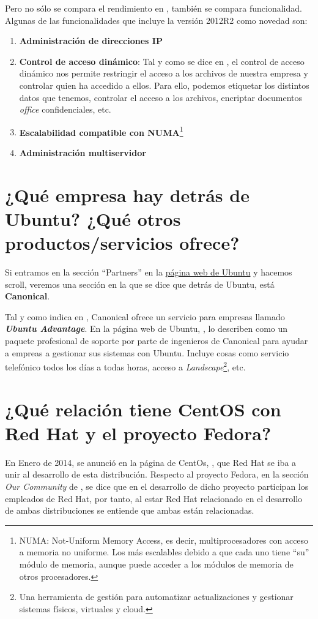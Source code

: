 \documentclass[10pt,a4paper,spanish]{article}
\numberwithin{equation}{section} %
\numberwithin{figure}{section} %
\numberwithin{table}{section} %
\begin{document}
Pero no sólo se compara el rendimiento en \cite{comws2012}, también se compara funcionalidad. Algunas de las funcionalidades que incluye la versión 2012R2 como novedad son:
\begin{enumerate}[$\bullet$]
    \item \textbf{Administración de direcciones IP}
    \item \textbf{Control de acceso dinámico}: Tal y como se dice en \cite{cad}, el control de acceso dinámico nos permite restringir el acceso a los archivos de nuestra empresa y controlar quien ha accedido a ellos. Para ello, podemos etiquetar los distintos datos que tenemos, controlar el acceso a los archivos, encriptar documentos \textit{office} confidenciales, etc.
    \item \textbf{Escalabilidad compatible con NUMA}\footnote{NUMA: Not-Uniform Memory Access, es decir, multiprocesadores con acceso a memoria no uniforme. Los más escalables debido a que cada uno tiene ``su'' módulo de memoria, aunque puede acceder a los módulos de memoria de otros procesadores.}
    \item \textbf{Administración multiservidor}
\end{enumerate}

\section{¿Qué empresa hay detrás de Ubuntu? ¿Qué otros productos/servicios ofrece?}
Si entramos en la sección ``Partners'' en la \href{http://partners.ubuntu.com/}{página web de Ubuntu} y hacemos scroll, veremos una sección en la que se dice que detrás de Ubuntu, está \textbf{Canonical}.

Tal y como indica en \cite{sercan}, Canonical ofrece un servicio para empresas llamado \textbf{\textit{Ubuntu Advantage}}. En la página web de Ubuntu, \cite{ua}, lo describen como un paquete profesional de soporte por parte de ingenieros de Canonical para ayudar a empreas a gestionar sus sistemas con Ubuntu. Incluye cosas como servicio telefónico todos los días a todas horas, acceso a \textit{Landscape}\footnote{Una herramienta de gestión para automatizar actualizaciones y gestionar sistemas físicos, virtuales y cloud.}, etc.

\section{¿Qué relación tiene CentOS con Red Hat y el proyecto Fedora?}
En Enero de 2014, se anunció en la página de CentOs, \cite{centos}, que Red Hat se iba a unir al desarrollo de esta distribución. Respecto al proyecto Fedora, en la sección \textit{Our Community} de \cite{fedora}, se dice que en el desarrollo de dicho proyecto participan los empleados de Red Hat, por tanto, al estar Red Hat relacionado en el desarrollo de ambas distribuciones se entiende que ambas están relacionadas.
\end{document}

